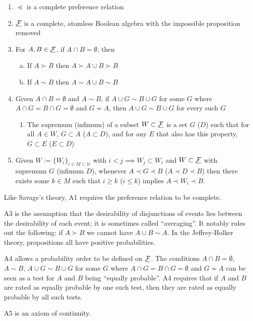 \begin{enumerate}[A1:]
    \item $\preceq$ is a complete preference relation
    \item $\underline{\mathcal{F}}$ is a complete, atomless Boolean algebra with the impossible proposition removed
    \item For $A,B\in \underline{\mathcal{F}}$, if $A\cap B=\emptyset$, then
    \begin{enumerate}[a)]
        \item If $A\succ B$ then $A\succ A\cup B \succ B$
        \item If $A\sim B$ then $A\sim A\cup B \sim B$
    \end{enumerate}
    \item Given $A\cap B=\emptyset$ and $A\sim B$, if $A\cup G\sim B\cup G$ for some $G$ where $A\cap G=B\cap G=\emptyset$ and $G\not\sim A$, then $A\cup G\sim B\cup G$ for every such $G$
    \begin{enumerate}[D1:]
        \item The supremum (infimum) of a subset $W\subset \underline{\mathcal{F}}$ is a set $G$ ($D$) such that for all $A\in W$, $G\subset A$ ($A\subset D$), and for any $E$ that also has this property, $G\subset E$ ($E\subset D$)
    \end{enumerate}
    \item Given $W:= \{W_i\}_{i\in M\subset \mathbb{N}}$ with $i<j\implies W_j\subset W_i$ and $W\subset \underline{\mathcal{F}}$ with supremum $G$ (infimum $D$), whenever $A\prec G \prec B$ ($A\prec D\prec B$) then there exists some $k\in M$ such that $i\geq k$ ($i\leq k$) implies $A\prec W_i \prec B$.
\end{enumerate}

Like Savage's theory, A1 requires the preference relation to be complete.

A3 is the assumption that the desirability of disjunctions of events lies between the desirability of each event; it is sometimes called ``averaging''. It notably rules out the following: if $A\succ B$ we cannot have $A\cup B\sim A$. In the Jeffrey-Bolker theory, propositions all have positive probabilities.

A4 allows a probability order to be defined on $\underline{\mathcal{F}}$. The conditions $A\cap B=\emptyset$, $A\sim B$, $A\cup G\sim B\cup G$ for some $G$ where $A\cap G=B\cap G=\emptyset$ and $G\not\sim A$ can be seen as a test for $A$ and $B$ being ``equally probable''. A4 requires that if $A$ and $B$ are rated as equally probable by one such test, then they are rated as equally probable by all such tests.

A5 is an axiom of continuity.